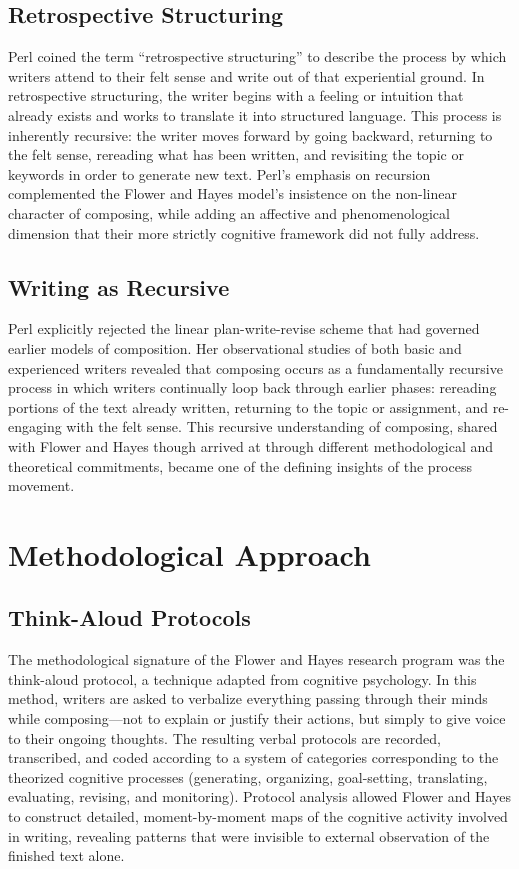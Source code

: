 \documentclass[12pt]{article}
\begin{document}
\subsection{Retrospective Structuring}

Perl coined the term ``retrospective structuring'' to describe the process by which writers attend to their felt sense and write out of that experiential ground. In retrospective structuring, the writer begins with a feeling or intuition that already exists and works to translate it into structured language. This process is inherently recursive: the writer moves forward by going backward, returning to the felt sense, rereading what has been written, and revisiting the topic or keywords in order to generate new text. Perl's emphasis on recursion complemented the Flower and Hayes model's insistence on the non-linear character of composing, while adding an affective and phenomenological dimension that their more strictly cognitive framework did not fully address.

\subsection{Writing as Recursive}

Perl explicitly rejected the linear plan-write-revise scheme that had governed earlier models of composition. Her observational studies of both basic and experienced writers revealed that composing occurs as a fundamentally recursive process in which writers continually loop back through earlier phases: rereading portions of the text already written, returning to the topic or assignment, and re-engaging with the felt sense. This recursive understanding of composing, shared with Flower and Hayes though arrived at through different methodological and theoretical commitments, became one of the defining insights of the process movement.

\section{Methodological Approach}

\subsection{Think-Aloud Protocols}

The methodological signature of the Flower and Hayes research program was the think-aloud protocol, a technique adapted from cognitive psychology. In this method, writers are asked to verbalize everything passing through their minds while composing---not to explain or justify their actions, but simply to give voice to their ongoing thoughts. The resulting verbal protocols are recorded, transcribed, and coded according to a system of categories corresponding to the theorized cognitive processes (generating, organizing, goal-setting, translating, evaluating, revising, and monitoring). Protocol analysis allowed Flower and Hayes to construct detailed, moment-by-moment maps of the cognitive activity involved in writing, revealing patterns that were invisible to external observation of the finished text alone.
\end{document}
